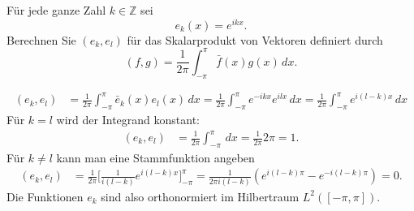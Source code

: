 Für jede ganze Zahl $k\in\mathbb Z$ sei
\[
e_k(x)=e^{ikx}.
\]
Berechnen Sie  $(e_k,e_l)$ für das Skalarprodukt von Vektoren definiert
durch
\[
(f,g)=\frac1{2\pi}\int_{-\pi}^{\pi}\bar f(x)g(x)\,dx.
\]

\begin{loesung}
\begin{align*}
(e_k,e_l)
&=
\frac1{2\pi}\int_{-\pi}^{\pi} \bar e_k(x)e_l(x)\,dx
=
\frac1{2\pi}\int_{-\pi}^{\pi} e^{-ikx}e^{ilx} \,dx
=
\frac1{2\pi}\int_{-\pi}^{\pi} e^{i(l-k)x} \,dx
\end{align*}
Für $k=l$ wird der Integrand konstant:
\begin{align*}
(e_k,e_l)
&=
\frac1{2\pi}\int_{-\pi}^{\pi} \,dx=\frac1{2\pi}2\pi=1.
\end{align*}
Für $k\ne l$ kann man eine Stammfunktion angeben
\begin{align*}
(e_k,e_l)
&=
\frac1{2\pi}\biggl[
\frac1{i(l-k)}e^{i(l-k)x}
\biggr]_{-\pi}^\pi
=\frac1{2\pi i(l-k)}(e^{i(l-k)\pi}-e^{-i(l-k)\pi})=0.
\end{align*}
Die Funktionen $e_k$ sind also orthonormiert im Hilbertraum $L^2([-\pi,\pi])$.
\end{loesung}

